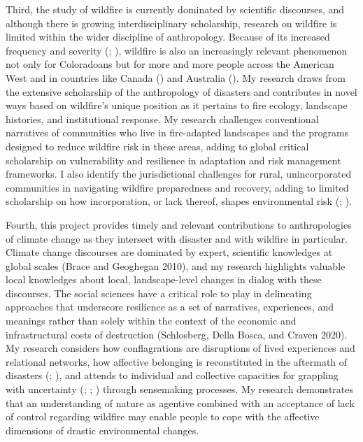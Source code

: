 \documentclass[
]{article}
\begin{document}
Third, the study of wildfire is currently dominated by scientific discourses, and although there is growing interdisciplinary scholarship, research on wildfire is limited within the wider discipline of anthropology. Because of its increased frequency and severity (; ), wildfire is also an increasingly relevant phenomenon not only for Coloradoans but for more and more people across the American West and in countries like Canada () and Australia (). My research draws from the extensive scholarship of the anthropology of disasters and contributes in novel ways based on wildfire's unique position as it pertains to fire ecology, landscape histories, and institutional response. My research challenges conventional narratives of communities who live in fire-adapted landscapes and the programs designed to reduce wildfire risk in these areas, adding to global critical scholarship on vulnerability and resilience in adaptation and risk management frameworks. I also identify the jurisdictional challenges for rural, unincorporated communities in navigating wildfire preparedness and recovery, adding to limited scholarship on how incorporation, or lack thereof, shapes environmental risk (; ).

Fourth, this project provides timely and relevant contributions to anthropologies of climate change as they intersect with disaster and with wildfire in particular. Climate change discourses are dominated by expert, scientific knowledges at global scales (Brace and Geoghegan 2010), and my research highlights valuable local knowledges about local, landscape-level changes in dialog with these discourses. The social sciences have a critical role to play in delineating approaches that underscore resilience as a set of narratives, experiences, and meanings rather than solely within the context of the economic and infrastructural costs of destruction (Schlosberg, Della Bosca, and Craven 2020). My research considers how conflagrations are disruptions of lived experiences and relational networks, how affective belonging is reconstituted in the aftermath of disasters (; ), and attends to individual and collective capacities for grappling with uncertainty (; ; ) through sensemaking processes. My research demonstrates that an understanding of nature as agentive combined with an acceptance of lack of control regarding wildfire may enable people to cope with the affective dimensions of drastic environmental changes.
\end{document}
